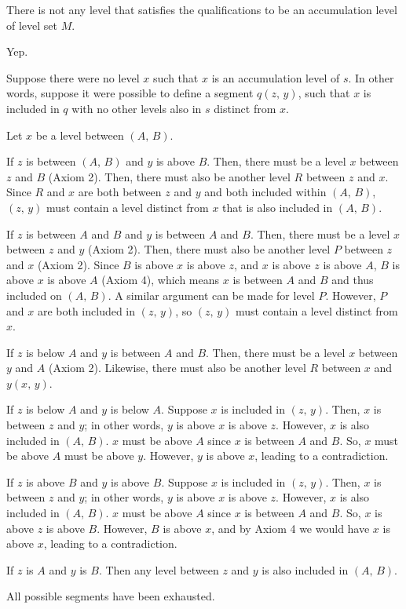 There is not any level that satisfies the qualifications to be an accumulation level of level set $M$.

\problem
{}
Yep.

Suppose there were no level $x$ such that $x$ is an accumulation level of $s$. In other words, suppose it were possible to define a segment $q(z,\, y)$, such that $x$ is included in $q$ with no other levels also in $s$ distinct from $x$.

Let $x$ be a level between $(A,\, B)$.

If $z$ is between $(A,\, B)$ and $y$ is above $B$. Then, there must be a level $x$ between $z$ and $B$ (Axiom 2). Then, there must also be another level $R$ between $z$ and $x$. Since $R$ and $x$ are both between $z$ and $y$ and both included within $(A,\, B)$, $(z,\, y)$ must contain a level distinct from $x$ that is also included in $(A,\, B)$.

If $z$ is between $A$ and $B$ and $y$ is between $A$ and $B$. Then, there must be a level $x$ between $z$ and $y$ (Axiom 2). Then, there must also be another level $P$ between $z$ and $x$ (Axiom 2). Since $B$ is above $x$ is above $z$, and $x$ is above $z$ is above $A$, $B$ is above $x$ is above $A$ (Axiom 4), which means $x$ is between $A$ and $B$ and thus included on $(A,\, B)$. A similar argument can be made for level $P$. However, $P$ and $x$ are both included in $(z,\, y)$, so $(z,\, y)$ must contain a level distinct from $x$.

If $z$ is below $A$ and $y$ is between $A$ and $B$. Then, there must be a level $x$ between $y$ and $A$ (Axiom 2). Likewise, there must also be another level $R$ between $x$ and $y(x,\, y)$.

If $z$ is below $A$ and $y$ is below $A$. Suppose $x$ is included in $(z,\, y)$. Then, $x$ is between $z$ and $y$; in other words, $y$ is above $x$ is above $z$.  However, $x$ is also included in $(A,\, B)$. $x$ must be above $A$ since $x$ is between $A$ and $B$. So, $x$ must be above $A$ must be above $y$. However, $y$ is above $x$, leading to a contradiction.

If $z$ is above $B$ and $y$ is above $B$. Suppose $x$ is included in $(z,\, y)$. Then, $x$ is between $z$ and $y$; in other words, $y$ is above $x$ is above $z$. However, $x$ is also included in $(A,\, B)$. $x$ must be above $A$ since $x$ is between $A$ and $B$. So, $x$ is above $z$ is above $B$. However, $B$ is above $x$, and by Axiom 4 we would have $x$ is above $x$, leading to a contradiction.

If $z$ is $A$ and $y$ is $B$. Then any level between $z$ and $y$ is also included in $(A,\, B)$.

All possible segments have been exhausted.





